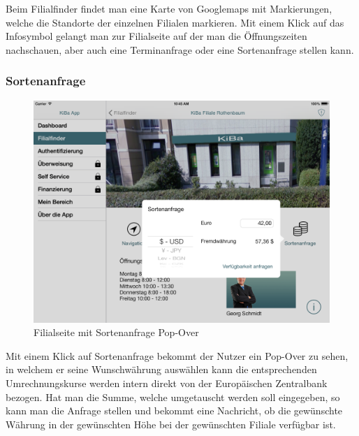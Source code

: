 	Beim Filialfinder findet man eine Karte von Googlemaps mit Markierungen, welche die Standorte der einzelnen Filialen markieren. Mit einem Klick auf das Infosymbol gelangt man zur Filialseite auf der man die Öffnungszeiten nachschauen, aber auch eine Terminanfrage oder eine Sortenanfrage stellen kann. 

\subsubsection{Sortenanfrage}

\begin{figure}[h]
	\centering
  \includegraphics[scale=0.4]{Pictures/Sortenanfrage}
	\caption{Filialseite mit Sortenanfrage Pop-Over}
	\label{fig3}
\end{figure}

	Mit einem Klick auf Sortenanfrage bekommt der Nutzer ein Pop-Over zu sehen, in welchem er seine Wunschwährung auswählen kann die entsprechenden Umrechnungskurse werden intern direkt von der Europäischen Zentralbank bezogen. Hat man die Summe, welche umgetauscht werden soll eingegeben, so kann man die Anfrage stellen und bekommt eine Nachricht, ob die gewünschte Währung in der gewünschten Höhe bei der gewünschten Filiale verfügbar ist.

